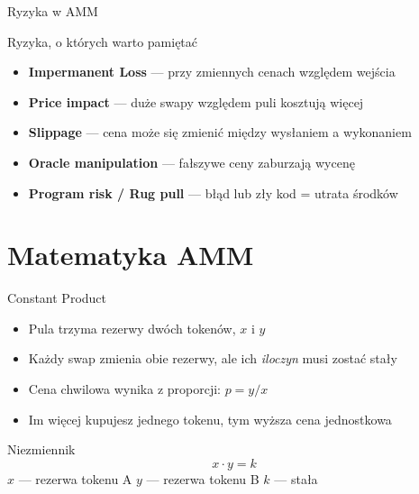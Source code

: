 \begin{frame}{Ryzyka w AMM}
  \addtocounter{beamerpauses}{-1}%
  \begin{alertblock}{Ryzyka, o których warto pamiętać}
    \begin{itemize}
      \item \textbf{Impermanent Loss} --- przy zmiennych cenach względem wejścia
      \item \textbf{Price impact} --- duże swapy względem puli kosztują więcej
      \item \textbf{Slippage} --- cena może się zmienić między wysłaniem a wykonaniem
      \item \textbf{Oracle manipulation} --- fałszywe ceny zaburzają wycenę
      \item \textbf{Program risk / Rug pull} --- błąd lub zły kod = utrata środków
    \end{itemize}
  \end{alertblock}
\end{frame}

\section{Matematyka AMM}

\begin{frame}{Constant Product}
  \begin{itemize}
    \item Pula trzyma rezerwy dwóch tokenów, $x$ i $y$
    \item Każdy swap zmienia obie rezerwy, ale ich \emph{iloczyn} musi zostać stały
    \item Cena chwilowa wynika z proporcji: $p = y / x$
    \item Im więcej kupujesz jednego tokenu, tym wyższa cena jednostkowa
  \end{itemize}
  \vspace{0.3cm}
  \begin{block}{Niezmiennik}
    \[
      x \cdot y = k
    \]
    $x$ --- rezerwa tokenu A \quad $y$ --- rezerwa tokenu B \quad $k$ --- stała
  \end{block}
\end{frame}

